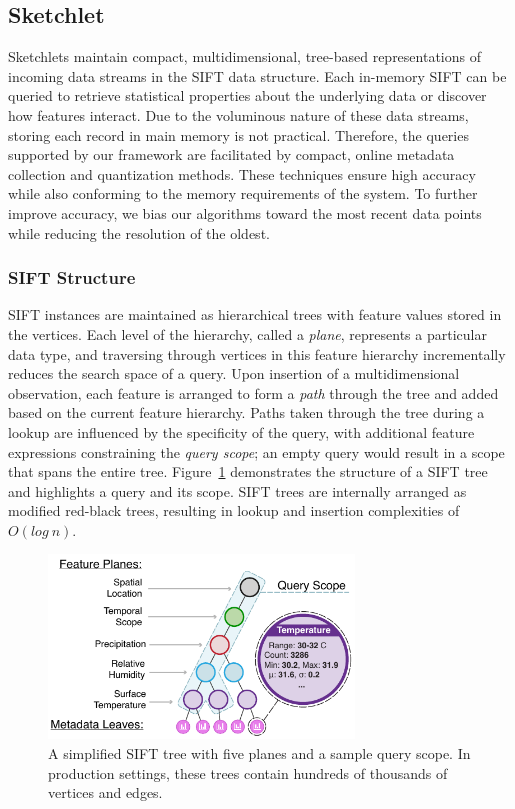 \subsection{Sketchlet}
\label{sec:sketch}
Sketchlets maintain compact, multidimensional, tree-based representations of incoming data streams in the SIFT data structure. Each in-memory SIFT can be queried to retrieve statistical properties about the underlying data or discover how features interact. Due to the voluminous nature of these data streams, storing each record in main memory is not practical. Therefore, the queries supported by our framework are facilitated by compact, online metadata collection and quantization methods. These techniques ensure high accuracy while also conforming to the memory requirements of the system. To further improve accuracy, we bias our algorithms toward the most recent data points while reducing the resolution of the oldest.

\subsubsection{SIFT Structure}
\label{sec:sift}
SIFT instances are maintained as hierarchical trees with feature values stored in the vertices. Each level of the hierarchy, called a \emph{plane}, represents a particular data type, and traversing through vertices in this feature hierarchy incrementally reduces the search space of a query. Upon insertion of a multidimensional observation, each feature is arranged to form a \emph{path} through the tree and added based on the current feature hierarchy. Paths taken through the tree during a lookup are influenced by the specificity of the query, with additional feature expressions constraining the \emph{query scope}; an empty query would result in a scope that spans the entire tree. Figure~\ref{fig:sketch} demonstrates the structure of a SIFT tree and highlights a query and its scope. SIFT trees are internally arranged as modified red-black trees, resulting in lookup and insertion complexities of $O(log\ n)$.

\begin{figure}[b!]
    \centerline{\includegraphics[width=3.2in]{figures/sketch.pdf}}
    \caption{A simplified SIFT tree with five planes and a sample query scope. In production settings, these trees contain hundreds of thousands of vertices and edges.}
    \label{fig:sketch}
\end{figure}

